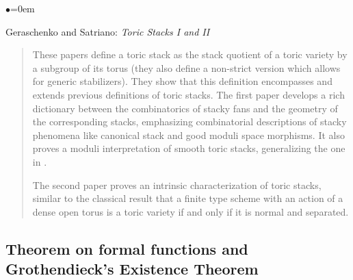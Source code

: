 \begin{list}{$\bullet$}{\leftmargin=0em}
\item Geraschenko and Satriano:  \emph{Toric Stacks I and II}
\cite{gs_toric1,gs_toric2}
\begin{quote}
These papers define a toric stack as the stack quotient of a toric
variety by a subgroup of its torus (they also define a non-strict version
which allows for generic stabilizers). They show that this definition
encompasses and extends previous definitions of toric stacks. The first
paper develops a rich dictionary between the combinatorics of stacky fans
and the geometry of the corresponding stacks, emphasizing combinatorial
descriptions of stacky phenomena like canonical stack and good moduli
space morphisms. It also proves a moduli interpretation of smooth toric
stacks, generalizing the one in \cite{perroni}.

The second paper proves an intrinsic characterization of toric stacks,
similar to the classical result that a finite type scheme with an action
of a dense open torus is a toric variety if and only if it is normal and
separated.
\end{quote}
\end{list}



\subsection{Theorem on formal functions and Grothendieck's Existence Theorem}
\label{subsection-theorem-formal-functions}

